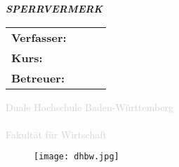 \begin{titlepage}
	\thispagestyle{empty}

	\begin{center}
		\LARGE{\textbf{\arbeitstitel}}
	\end{center}
	\ifsperrvermerk
		\begin{turn}{20}
			\LARGE{\textbf{\textsl{SPERRVERMERK}}}
		\end{turn}
	\else  \vspace*{\fill} \fi
	\vspace*{\fill}

	\begin{center}
		\begin{tabular}{llll}
			\textbf{Verfasser:} &  & \autor    & \\
			\textbf{Kurs:}      &  & \kurs     & \\
			\textbf{Betreuer:}  &  & \betreuer & \\
		\end{tabular}
	\end{center}

	\vspace*{\fill}

		\begin{center}
			\textcolor{lightgrey}{Duale Hochschule Baden-Württemberg\\
				\dhbw\\
				Fakultät für Wirtschaft}
			\begin{figure}[H]
				\centering
				\texttt{[image: dhbw.jpg]}
			\end{figure}
		\end{center}
\end{titlepage}
